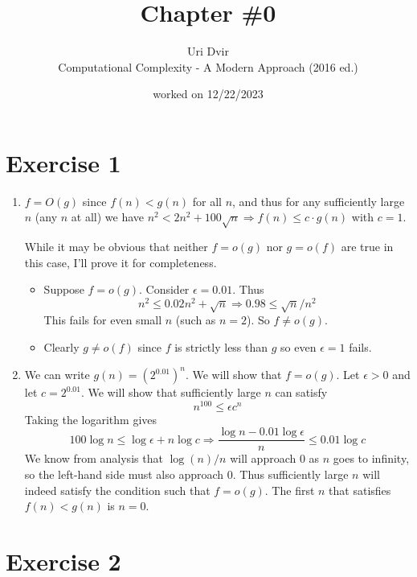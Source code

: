 \documentclass[12pt]{article}
\title{Chapter \#0}
\author{Uri Dvir \\ Computational Complexity - A Modern Approach (2016 ed.)}
\date{worked on 12/22/2023}
\begin{document}
\maketitle

\section*{Exercise 1}

\begin{enumerate}
\item{
$f = O(g)$ since $f(n) < g(n)$ for all $n$, and thus for any sufficiently large $n$ (any $n$ at all) we have $n^2 < 2n^2 + 100\sqrt{n} \Rightarrow f(n) \leq c \cdot g(n)$ with $c = 1$.

\noindent
While it may be obvious that neither $f = o(g)$ nor $g = o(f)$ are true in this case, I'll prove it for completeness.
\begin{itemize}
\item{Suppose $f = o(g)$. Consider $\epsilon = 0.01$. Thus
$$
n^2 \leq 0.02n^2 + \sqrt{n} \Rightarrow 0.98 \leq \sqrt{n}/n^2
$$
This fails for even small $n$ (such as $n=2$). So $f \neq o(g)$.}
\item{Clearly $g \neq o(f)$ since $f$ is strictly less than $g$ so even $\epsilon = 1$ fails.}
\end{itemize}
}
\item{
We can write $g(n) = (2^{0.01})^n$. We will show that $f = o(g)$. Let $\epsilon > 0$ and let $c = 2^{0.01}$. We will show that sufficiently large $n$ can satisfy
$$
n^{100} \leq \epsilon c^n
$$
Taking the logarithm gives
$$
100 \log n \leq \log \epsilon + n \log c
\Rightarrow
\frac{\log n - 0.01 \log \epsilon}{n} \leq 0.01\log c
$$
We know from analysis that $\log(n)/n$ will approach 0 as $n$ goes to infinity, so the left-hand side must also approach 0. Thus sufficiently large $n$ will indeed satisfy the condition such that $f = o(g)$. The first $n$ that satisfies $f(n) < g(n)$ is $n=0$.
}
\end{enumerate}

\section*{Exercise 2}
\end{document}
